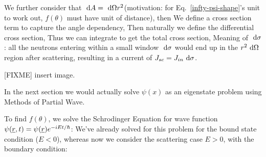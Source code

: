 \documentclass{school-22.101-notes}
\begin{document}
We further consider that $\mbox{ }\mathrm{d} A = \mbox{ }\mathrm{d} \Omega r^2$(motivation: for Eq.~\ref{infty-psi-shape}'s unit to work out, $f(\theta)$ must have unit of distance), then 
We define a cross section term to capture the angle dependency, 
Then naturally we define the differential cross section, 
Thus we can integrate to get the total cross section, 
Meaning of $\mbox{ }\mathrm{d} \sigma$: all the neutrons entering within a small window $\mbox{ }\mathrm{d} \sigma$ would end up in the $r^2 \mbox{ }\mathrm{d} \Omega$ region after scattering, resulting in a current of $J_{sc} = J_{in} \mbox{ }\mathrm{d} \sigma$. 

[FIXME] insert image. 






In the next section we would actually solve $\psi(x)$ as an eigenstate problem using Methods of Partial Wave. 






To find $f(\theta)$, we solve the Schrodinger Equation for wave function $\psi(\underline{r}, t) = \psi(\underline{r}) e^{-iEt/\hbar}$:
We've already solved for this problem for the bound state condition ($E <0$), whereas now we consider the scattering case $E>0$, with the boundary condition:
\end{document}
